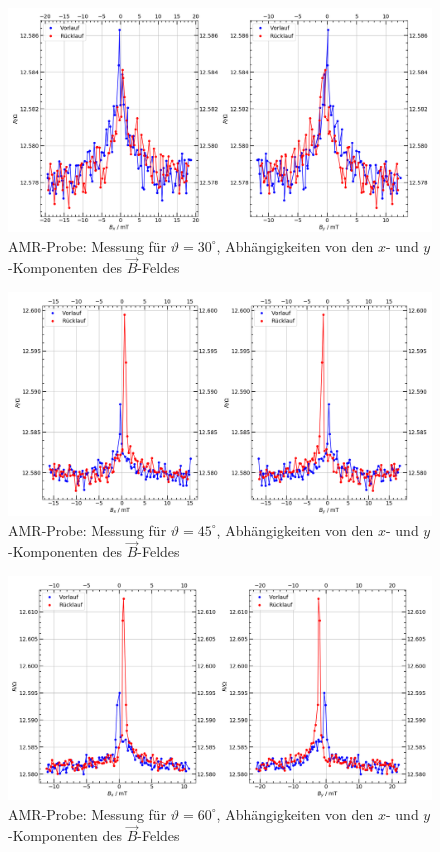 \documentclass[german,  %
parskip=full,  %
]{scrartcl}
\begin{document}
\newpage
\begin{figure}[h!]\centering
\includegraphics[width=\textwidth]{Probe3_30_Grad.png}
\caption{AMR-Probe: Messung für \(\vartheta=30^{\circ}\), Abhängigkeiten von den \(x\)- und \(y\)-Komponenten des \(\vec{B}\)-Feldes}
\end{figure} 
\begin{figure}[h!]\centering
\includegraphics[width=\textwidth]{Probe3_45_Grad.png}
\caption{AMR-Probe: Messung für \(\vartheta=45^{\circ}\), Abhängigkeiten von den \(x\)- und \(y\)-Komponenten des \(\vec{B}\)-Feldes}
\end{figure} 
\newpage
\begin{figure}[h!]\centering
\includegraphics[width=\textwidth]{Probe3_60_Grad.png}
\caption{AMR-Probe: Messung für \(\vartheta=60^{\circ}\), Abhängigkeiten von den \(x\)- und \(y\)-Komponenten des \(\vec{B}\)-Feldes}
\end{figure} 
\end{document}
